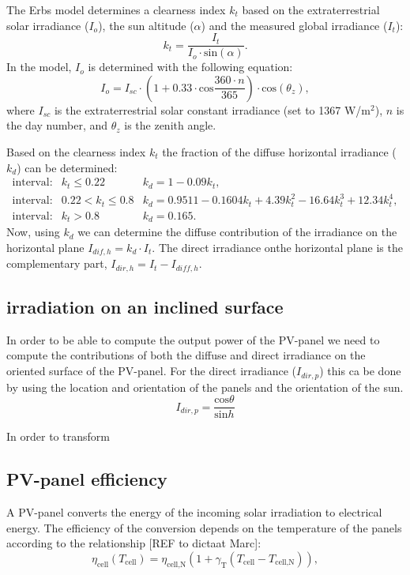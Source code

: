 The Erbs model determines a clearness index $k_t$ based on the extraterrestrial solar irradiance ($I_o$), the sun altitude ($\alpha$) and the measured global irradiance ($I_t$):
\begin{equation}
	k_t = \frac{I_t}{I_o\cdot \text{sin}\left(\alpha\right)}.
\end{equation}
In the model, $I_o$ is determined with the following equation:
\begin{equation}
	I_o = I_{sc} \cdot \left(1 + 0.33\cdot\text{cos}\frac{360\cdot n}{365}\right)\cdot \text{cos}\left(\theta_z\right) ,
\end{equation}
where $I_{sc}$ is the extraterrestrial solar constant irradiance (set to 1367 W/$\text{m}^2$), $n$ is the day number, and $\theta_z$ is the zenith angle.

Based on the clearness index $k_t$ the fraction of the diffuse horizontal irradiance ($k_d$) can be determined:
\begin{eqnarray}
	\text{interval:} & k_t \leq 0.22 & k_d = 1 - 0.09k_t ,\\
	\text{interval:} & 0.22 < k_t \leq 0.8 & k_d = 0.9511 - 0.1604 k_t + 4.39 k_t^2 -16.64 k_t^3 + 12.34 k_t^4 , \\
	\text{interval:} & k_t > 0.8 & k_d = 0.165 .
\label{eq:diffuse_fraction}
\end{eqnarray} 
Now, using $k_d$ we can determine the diffuse contribution of the irradiance on the horizontal plane $I_{dif,h} = k_d \cdot I_t$. The direct irradiance onthe horizontal plane is the complementary part, $I_{dir,h} = I_t - I_{diff,h}$. 

\subsection{irradiation on an inclined surface}
In order to be able to compute the output power of the PV-panel we need to compute the contributions of both the diffuse and direct irradiance on the oriented surface of the PV-panel. For the direct irradiance ($I_{dir,p}$) this ca be done by using the location and orientation of the panels and the orientation of the sun.
\begin{equation}
		I_{dir,p} = \frac{\text{cos}\theta}{\text{sin}h}
\label{eq:direct_plane}
\end{equation}


In order to transform    



\subsection{PV-panel efficiency}
A PV-panel converts the energy of the incoming solar irradiation to electrical energy. The efficiency of the conversion depends on the temperature of the panels according to the relationship [REF to dictaat Marc]:
\begin{equation}
  \eta_{\text{cell}}(T_{\text{cell}}) = \eta_{\text{cell,N}} \left( 1 + \gamma_{\text{T}}\left(T_{\text{cell}} - T_{\text{cell,N}} \right) \right),
	\label{eq:efficiency_pv}
\end{equation}   

